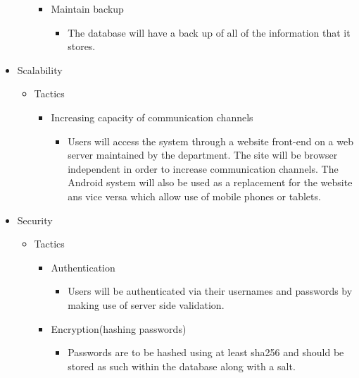 \documentclass[a4paper,12pt]{article}
\begin{document}
\begin{itemize}
\begin{itemize}
\begin{itemize}
				\item Maintain backup
				
					\begin{itemize}
						\item The database will have a back up of all of the information that it stores.
					\end{itemize}
								

			\end{itemize}
						
		\end{itemize}
		\item Scalability
		\begin{itemize}
			
			\item Tactics
			\begin{itemize}

				\item Increasing capacity of communication channels
					
					\begin{itemize}
						\item Users will access the system through a website front-end on a web server maintained by the department. The site will be browser independent in order to increase communication channels. The Android system will also be used as a replacement for the website ans vice versa which allow use of mobile phones or tablets.
					\end{itemize}

			\end{itemize}
						
		\end{itemize}
		\item Security
		\begin{itemize}
			
			\item Tactics
			\begin{itemize}
				
				\item Authentication
					
					\begin{itemize}
						\item Users will be authenticated via their usernames and passwords by making use of server side validation.
					\end{itemize}
					
				\item Encryption(hashing passwords)
				
					\begin{itemize}
						 \item Passwords are to be hashed using at least sha256 and should be stored as such within the database along with a salt.
					\end{itemize}				 		
						 

\end{itemize}
\end{itemize}
\end{itemize}
\end{document}
